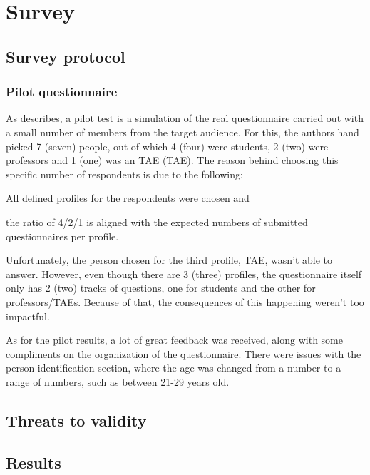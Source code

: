 
\chapter{Survey}\label{survey}

\section{Survey protocol}\label{sec:sv-p}

\subsection{Pilot questionnaire}\label{sec:sv-p:pilot}

As  describes, a pilot test is a simulation of the real questionnaire carried out with a small number of members from the target audience. For this, the authors hand picked 7 (seven) people, out of which 4 (four) were students, 2 (two) were professors and 1 (one) was an \acl{TAE} (\ac{TAE}). The reason behind choosing this specific number of respondents is due to the following:
\begin{inparaenum}[(i)]
    \item All defined profiles for the respondents were chosen and
    \item the ratio of 4/2/1 is aligned with the expected numbers of submitted questionnaires per profile.
\end{inparaenum}

Unfortunately, the person chosen for the third profile, \ac{TAE}, wasn't able to answer. However, even though there are 3 (three) profiles, the questionnaire itself only has 2 (two) tracks of questions, one for students and the other for professors/\acp{TAE}. Because of that, the consequences of this happening weren't too impactful.

As for the pilot results, a lot of great feedback was received, along with some compliments on the organization of the questionnaire. There were issues with the person identification section, where the age was changed from a number to a range of numbers, such as between 21-29 years old.

\section{Threats to validity}\label{sec:sv-validity}


\section{Results}\label{sec:sv-results}